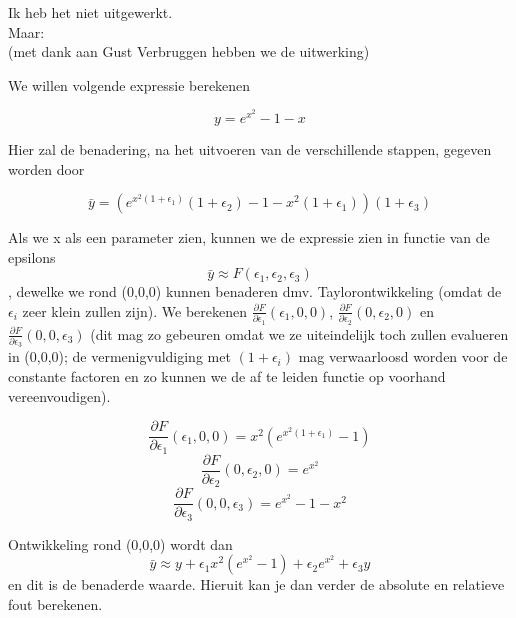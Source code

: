 Ik heb het niet uitgewerkt.\\
Maar:\\ (met dank aan Gust Verbruggen hebben we de uitwerking)

We willen volgende expressie berekenen

\[y = e^{x^2} - 1 - x\]

Hier zal de benadering, na het uitvoeren van de verschillende stappen, gegeven worden door

\[\bar{y} = (e^{x^2 (1 + \epsilon_1)}(1 + \epsilon_2) - 1 - x^2(1 + \epsilon_1))(1 + \epsilon_3)\]

Als we x als een parameter zien, kunnen we de expressie zien in functie van de epsilons \[\bar{y} \approx F(\epsilon_1,\epsilon_2,\epsilon_3)\], dewelke we rond (0,0,0) kunnen benaderen dmv. Taylorontwikkeling (omdat de $\epsilon_i$ zeer klein zullen zijn). We berekenen $\frac{\partial F}{\partial \epsilon_1}(\epsilon_1,0,0)$, $\frac{\partial F}{\partial \epsilon_2}(0,\epsilon_2,0)$ en $\frac{\partial F}{\partial \epsilon_3}(0,0,\epsilon_3)$ (dit mag zo gebeuren omdat we ze uiteindelijk toch zullen evalueren in (0,0,0); de vermenigvuldiging met $(1+\epsilon_i)$ mag verwaarloosd worden voor de constante factoren en zo kunnen we de af te leiden functie op voorhand vereenvoudigen).

\[
\frac{\partial F}{\partial \epsilon_1}(\epsilon_1,0,0) = x^2 (e^{x^2 (1 + \epsilon_1)} - 1)
\]
\[
\frac{\partial F}{\partial \epsilon_2}(0,\epsilon_2,0) = e^{x^2}
\]
\[
\frac{\partial F}{\partial \epsilon_3}(0,0,\epsilon_3) = e^{x^2} - 1 - x^2
\]

Ontwikkeling rond (0,0,0) wordt dan
\[\bar{y} \approx y + \epsilon_1 x^2 (e^{x^2} - 1) + \epsilon_2 e^{x^2} + \epsilon_3 y\]
en dit is de benaderde waarde. Hieruit kan je dan verder de absolute en relatieve fout berekenen.
\\
